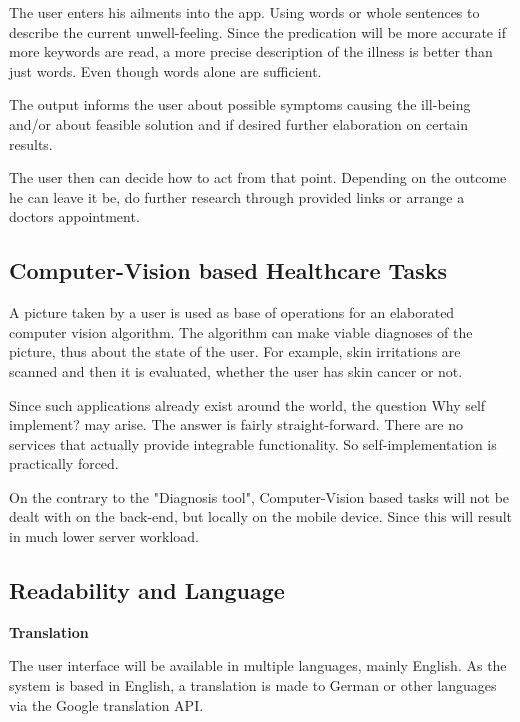 \documentclass[12pt]{article}
\theoremstyle{definition}
\begin{document}
\begin{minipage}{0.6\textwidth}

The user enters his ailments into the app. Using words or whole sentences to describe the current unwell-feeling. Since the predication will be more accurate if more keywords are read, a more precise description of the
illness is better than just words. Even though words alone are sufficient.

The output informs the user about possible symptoms causing the ill-being and/or about feasible solution and if desired further elaboration on certain results.

The user then can decide how to act from that point. Depending on the outcome he can leave it be, do further research through provided links or arrange a doctors appointment.

\end{minipage}

\subsection{Computer-Vision based Healthcare Tasks}

A picture taken by a user is used as base of operations for an elaborated computer vision algorithm. The algorithm can make viable diagnoses of the picture, thus about the state of the user. 
For example, skin irritations are scanned and then it is evaluated, whether the user has skin cancer or not.

Since such applications already exist around the world, the question Why self implement? may arise. The answer is fairly straight-forward. There are no services that actually provide integrable functionality. So self-implementation is practically forced.
    
On the contrary to the "Diagnosis tool", Computer-Vision based tasks will not be dealt with on the back-end, but locally on the mobile device. Since this will result in much lower server workload. 
    
\subsection{Readability and Language}

{\bf Translation}

The user interface will be available in multiple languages, mainly English. As the system is based in English, a translation is made to German or other languages via the Google translation API.
\end{document}
